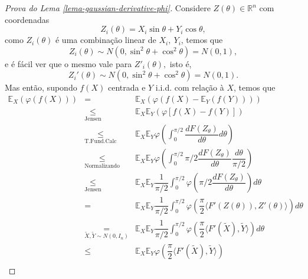 \documentclass[12pt,a4paper,oneside]{book}
\theoremstyle{definition}
\theoremstyle{remark}
\numberwithin{equation}{section}
\newcommand{\R}{\mathbb{R}}
\newcommand{\E}{\mathbb{E}}
\newcommand{\ds}{\displaystyle}
\begin{document}
\begin{proof}[Prova do Lema \ref{lema-gaussian-derivative-phi}]
Considere $Z(\theta)\in \R^n$ com coordenadas
$$ Z_i(\theta) = X_i \sin\theta+Y_i \cos\theta,$$
como $Z_i(\theta)$ é uma combinação linear de $X_i,\ Y_i$, temos que $$Z_i(\theta)\sim N(0,\sin^2\theta+\cos^2\theta) = N(0,1), $$
e é fácil ver que o mesmo vale para $Z'_i(\theta),$ isto é, 
$$Z_i'(\theta)\sim N(0,\sin^2\theta+\cos^2\theta) = N(0,1). $$
Mas então, supondo $f(X)$ centrada e $Y$ i.i.d. com relação à $X$, temos que
$$
\begin{array}{lcl}
\E_X(    \varphi(    f(X))) & =& \E_X(\varphi(f(X) - \E_Y(f(Y)))) \\
& \underset{\textrm{Jensen}}{\leq}&  \E_X\E_Y(\varphi[f(X) - f(Y)]) \\
& \underset{\textrm{T.Fund.Calc}}{\leq}& \E_X\E_Y\varphi\left(\ds\int_0^{\pi/2}\dfrac{d F(Z_\theta)}{d\theta}d\theta \right)\\
& \underset{\textrm{Normalizando}}{\leq}& \E_X\E_Y\varphi\left(\ds\int_0^{\pi/2}\pi/2\dfrac{d F(Z_\theta)}{d\theta}\dfrac{d\theta}{\pi/2} \right)\\
& \underset{\textrm{Jensen}}{\leq}& \E_X\E_Y\dfrac{1}{\pi/2}\ds\int_0^{\pi/2}\varphi\left(\pi/2\dfrac{d F(Z_\theta)}{d\theta}\right)d\theta \\
& =& \E_X\E_Y\dfrac{1}{\pi/2}\ds\int_0^{\pi/2}\varphi\left(\dfrac{\pi}{2}\langle F'(Z(\theta)),Z'(\theta)\rangle\right)d\theta \\
& \underset{\tilde{X},\tilde{Y}\sim N(0,I_n)}{=}& \E_X\E_Y\dfrac{1}{\pi/2}\ds\int_0^{\pi/2}\varphi\left(\dfrac{\pi}{2}\langle F'(\tilde{X}),\tilde{Y}\rangle\right)d\theta \\
& \leq& \E_X\E_Y\varphi\left(\dfrac{\pi}{2}\langle F'(\tilde{X}),\tilde{Y}\rangle\right) \\
\end{array}$$


\end{proof}
\end{document}
